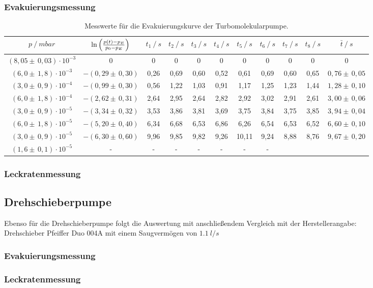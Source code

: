 \subsubsection{Evakuierungsmessung}
\begin{table}[H]
\tiny
\centering
\caption{Messwerte für die Evakuierungskurve der Turbomolekularpumpe.}
\label{tab:EvakuierungskurveTurbo}
\begin{tabular}{c|c|c|c|c|c|c|c|c|c|c}
{$p \:/\: \si{mbar}$} & {$\ln{\Bigl( \frac{p(t)-p_E}{p_0-p_E}\Bigr)}$} & {$t_1 \:/\: \si{s} $} & {$t_2 \:/\: \si{s}$} & {$t_3 \:/\: \si{s}$} & {$t_4 \:/\: \si{s}$} & {$t_5 \:/\: \si{s}$} & {$t_6 \:/\: \si{s}$}& {$t_7 \:/\: \si{s}$} & {$t_8 \:/\: \si{s}$} & {$\bar{t} \:/\: \si{s}$}\\
\midrule
$(8,05 \pm \, 0,03)\cdot 10^{-3}$ & 0 & 0 &  0 & 0 & 0 & 0 & 0 & 0 & 0 & 0\\
$(6,0 \pm \, 1,8)\cdot 10^{-3}$ & $-(0,29 \pm \, 0,30)$ & 0,26 & 0,69 & 0,60 & 0,52 & 0,61 & 0,69 & 0,60 & 0,65 & $0,76 \pm \, 0,05$\\
$(3,0 \pm \, 0,9)\cdot 10^{-4}$ & $-(0,99 \pm \, 0,30)$ & 0,56 & 1,22 & 1,03 & 0,91 & 1,17 & 1,25 & 1,23 & 1,44 & $1,28 \pm \, 0,10$\\
$(6,0 \pm \, 1,8)\cdot 10^{-4}$ & $-(2,62 \pm \, 0,31)$ & 2,64 & 2,95 & 2,64 & 2,82 & 2,92 & 3,02 & 2,91 & 2,61 & $3,00 \pm \, 0,06$\\
$(3,0 \pm \, 0,9)\cdot 10^{-5}$ & $-(3,34 \pm \, 0,32)$ & 3,53 & 3,86 & 3,81 & 3,69 & 3,75 & 3,84 & 3,75 & 3,85 & $3,94 \pm \, 0,04$\\
$(6,0 \pm \, 1,8)\cdot 10^{-5}$ & $-(5,20 \pm \, 0,40)$ & 6,34 & 6,68 & 6,53 & 6,86 & 6,26 & 6,54 & 6,53 & 6,52 & $6,60 \pm \, 0,10$\\
$(3,0 \pm \, 0,9)\cdot 10^{-5}$ & $-(6,30 \pm \, 0,60)$ & 9,96 & 9,85 & 9,82 & 9,26 & 10,11 & 9,24 & 8,88 & 8,76 & $9,67 \pm \, 0,20$\\
$(1,6 \pm \, 0,1)\cdot 10^{-5}$& - & - &  -& -& -& -& - \\
\end{tabular}
\end{table}

\subsubsection{Leckratenmessung}
\subsection{Drehschieberpumpe}
Ebenso für die Drehschieberpumpe folgt die Auswertung mit anschließendem Vergleich mit der
Herstellerangabe:\\
Drehschieber Pfeiffer Duo 004A mit einem Saugvermögen von $\SI{1,1}{l/s}$
\subsubsection{Evakuierungsmessung}
\subsubsection{Leckratenmessung}
